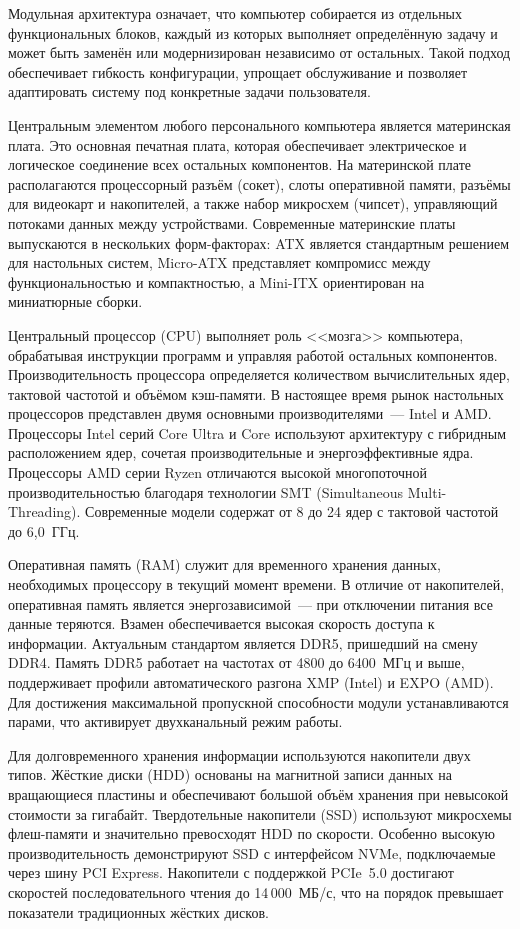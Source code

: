 \documentclass[14pt,a4paper]{extarticle}
\begin{document}
Модульная архитектура означает, что компьютер собирается из отдельных функциональных блоков, каждый из которых выполняет определённую задачу и может быть заменён или модернизирован независимо от остальных. Такой подход обеспечивает гибкость конфигурации, упрощает обслуживание и позволяет адаптировать систему под конкретные задачи пользователя.

Центральным элементом любого персонального компьютера является материнская плата. Это основная печатная плата, которая обеспечивает электрическое и логическое соединение всех остальных компонентов. На материнской плате располагаются процессорный разъём (сокет), слоты оперативной памяти, разъёмы для видеокарт и накопителей, а также набор микросхем (чипсет), управляющий потоками данных между устройствами. Современные материнские платы выпускаются в нескольких форм-факторах: ATX является стандартным решением для настольных систем, Micro-ATX представляет компромисс между функциональностью и компактностью, а Mini-ITX ориентирован на миниатюрные сборки.

Центральный процессор (CPU) выполняет роль <<мозга>> компьютера, обрабатывая инструкции программ и управляя работой остальных компонентов. Производительность процессора определяется количеством вычислительных ядер, тактовой частотой и объёмом кэш-памяти. В настоящее время рынок настольных процессоров представлен двумя основными производителями~--- Intel и AMD. Процессоры Intel серий Core Ultra и Core используют архитектуру с гибридным расположением ядер, сочетая производительные и энергоэффективные ядра. Процессоры AMD серии Ryzen отличаются высокой многопоточной производительностью благодаря технологии SMT (Simultaneous Multi-Threading). Современные модели содержат от 8 до 24 ядер с тактовой частотой до 6{,}0~ГГц.

Оперативная память (RAM) служит для временного хранения данных, необходимых процессору в текущий момент времени. В отличие от накопителей, оперативная память является энергозависимой~--- при отключении питания все данные теряются. Взамен обеспечивается высокая скорость доступа к информации. Актуальным стандартом является DDR5, пришедший на смену DDR4. Память DDR5 работает на частотах от 4800 до 6400~МГц и выше, поддерживает профили автоматического разгона XMP (Intel) и EXPO (AMD). Для достижения максимальной пропускной способности модули устанавливаются парами, что активирует двухканальный режим работы.

Для долговременного хранения информации используются накопители двух типов. Жёсткие диски (HDD) основаны на магнитной записи данных на вращающиеся пластины и обеспечивают большой объём хранения при невысокой стоимости за гигабайт. Твердотельные накопители (SSD) используют микросхемы флеш-памяти и значительно превосходят HDD по скорости. Особенно высокую производительность демонстрируют SSD с интерфейсом NVMe, подключаемые через шину PCI Express. Накопители с поддержкой PCIe~5.0 достигают скоростей последовательного чтения до 14\,000~МБ/с, что на порядок превышает показатели традиционных жёстких дисков.
\end{document}
